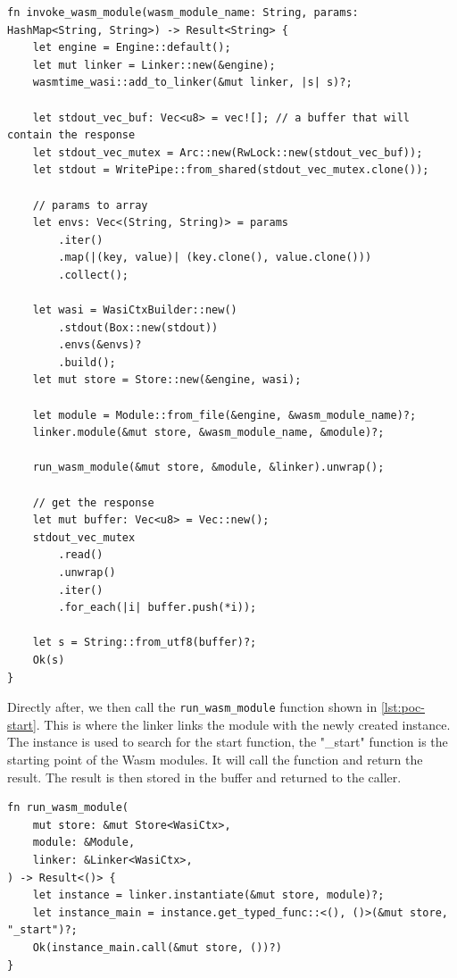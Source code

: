 \begin{lstlisting}[frame=lines, style=Rust, caption={invocation function}, showstringspaces=false, label={lst:poc-invocation}, captionpos=b]
fn invoke_wasm_module(wasm_module_name: String, params: HashMap<String, String>) -> Result<String> {
    let engine = Engine::default();
    let mut linker = Linker::new(&engine);
    wasmtime_wasi::add_to_linker(&mut linker, |s| s)?;

    let stdout_vec_buf: Vec<u8> = vec![]; // a buffer that will contain the response
    let stdout_vec_mutex = Arc::new(RwLock::new(stdout_vec_buf));
    let stdout = WritePipe::from_shared(stdout_vec_mutex.clone());

    // params to array
    let envs: Vec<(String, String)> = params
        .iter()
        .map(|(key, value)| (key.clone(), value.clone()))
        .collect();

    let wasi = WasiCtxBuilder::new()
        .stdout(Box::new(stdout))
        .envs(&envs)?
        .build();
    let mut store = Store::new(&engine, wasi);

    let module = Module::from_file(&engine, &wasm_module_name)?;
    linker.module(&mut store, &wasm_module_name, &module)?;

    run_wasm_module(&mut store, &module, &linker).unwrap();

    // get the response
    let mut buffer: Vec<u8> = Vec::new();
    stdout_vec_mutex
        .read()
        .unwrap()
        .iter()
        .for_each(|i| buffer.push(*i));

    let s = String::from_utf8(buffer)?;
    Ok(s)
}
\end{lstlisting}
%
Directly after, we then call the \texttt{run\_wasm\_module} function shown in \autoref{lst:poc-start}. This is where the linker links the module with the newly created instance. The instance is used to search for the start function, the "\_start" function is the starting point of the Wasm modules. It will call the function and return the result. The result is then stored in the buffer and returned to the caller.
%
\begin{lstlisting}[frame=lines, style=Rust, caption={calling the wasm start function}, showstringspaces=false, label={lst:poc-start}, captionpos=b]
fn run_wasm_module(
    mut store: &mut Store<WasiCtx>,
    module: &Module,
    linker: &Linker<WasiCtx>,
) -> Result<()> {
    let instance = linker.instantiate(&mut store, module)?;
    let instance_main = instance.get_typed_func::<(), ()>(&mut store, "_start")?;
    Ok(instance_main.call(&mut store, ())?)
}
\end{lstlisting}
